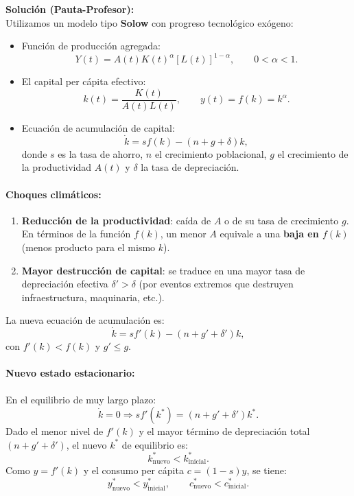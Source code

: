 \documentclass[11pt,addpoints]{article}
\begin{document}
\textbf{Solución (Pauta-Profesor):}\\[0.1cm]
Utilizamos un modelo tipo \textbf{Solow} con progreso tecnológico exógeno:

\begin{itemize}
  \item Función de producción agregada:
  \[
  Y(t) = A(t) K(t)^\alpha [L(t)]^{1-\alpha},\qquad 0<\alpha<1.
  \]
  \item El capital per cápita efectivo:
  \[
  k(t) = \frac{K(t)}{A(t)L(t)},\qquad
  y(t) = f(k) = k^\alpha.
  \]
  \item Ecuación de acumulación de capital:
  \[
  \dot{k} = s f(k) - (n + g + \delta)k,
  \]
  donde $s$ es la tasa de ahorro, $n$ el crecimiento poblacional, $g$ el crecimiento de la productividad $A(t)$ y $\delta$ la tasa de depreciación.
\end{itemize}

\paragraph{Choques climáticos:}
\begin{enumerate}
  \item \textbf{Reducción de la productividad}: caída de $A$ o de su tasa de crecimiento $g$. En términos de la función $f(k)$, un menor $A$ equivale a una \textbf{baja en $f(k)$} (menos producto para el mismo $k$).
  \item \textbf{Mayor destrucción de capital}: se traduce en una mayor tasa de depreciación efectiva $\delta' > \delta$ (por eventos extremos que destruyen infraestructura, maquinaria, etc.).
\end{enumerate}

La nueva ecuación de acumulación es:
\[
\dot{k} = s f'(k) - (n + g' + \delta')k,
\]
con $f'(k) < f(k)$ y $g' \leq g$.


\paragraph{Nuevo estado estacionario:}
En el equilibrio de muy largo plazo:
\[
\dot{k} = 0 \Rightarrow s f'(k^*) = (n + g' + \delta')k^*.
\]
Dado el menor nivel de $f'(k)$ y el mayor término de depreciación total $(n+g'+\delta')$, el nuevo $k^*$ de equilibrio es:
\[
k^*_{\text{nuevo}} < k^*_{\text{inicial}}.
\]
Como $y = f'(k)$ y el consumo per cápita $c = (1-s)y$, se tiene:
\[
y^*_{\text{nuevo}} < y^*_{\text{inicial}},\qquad
c^*_{\text{nuevo}} < c^*_{\text{inicial}}.
\]
\end{document}
